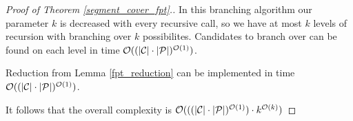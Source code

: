 \begin{proof}[Proof of Theorem \ref{segment_cover_fpt}.]
In this branching algorithm our parameter $k$ is decreased with every
recursive call, so we have at most $k$ levels of recursion with
branching over $k$ possibilites. Candidates to branch over
can be found on each level in time $\mathcal{O}((|\mathcal{C}|\cdot|\mathcal{P}|)^{\mathcal{O}(1)})$.

Reduction from Lemma \ref{fpt_reduction} can be implemented
in time $\mathcal{O}((|\mathcal{C}|\cdot|\mathcal{P}|)^{\mathcal{O}(1)})$.

It follows that the overall complexity
is $\mathcal{O}(((|\mathcal{C}|\cdot|\mathcal{P}|)^{\mathcal{O}(1)}) \cdot k^{\mathcal{O}(k)})$
\end{proof}

